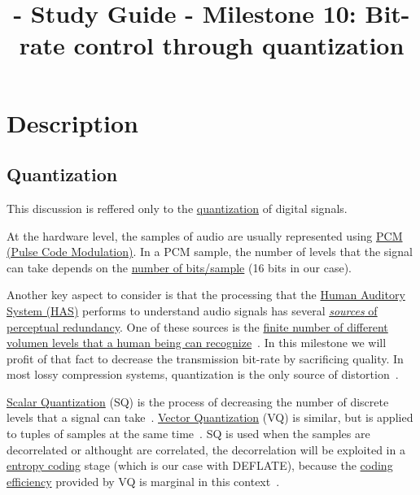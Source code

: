 
\title{\TM{} - Study Guide - Milestone 10: Bit-rate control through quantization}

\maketitle

\section{Description}

\subsection{Quantization}
This discussion is reffered only to the
\href{https://en.wikipedia.org/wiki/Quantization_(signal_processing)}{quantization}
of digital signals.

At the hardware level, the samples of audio are usually represented
using \href{https://en.wikipedia.org/wiki/Pulse-code_modulation}{PCM
  (Pulse Code Modulation)}. In a PCM sample, the number of levels that
the signal can take depends on the
\href{https://en.wikipedia.org/wiki/Audio_bit_depth}{number of
  bits/sample} (16 bits in our case).

Another key aspect to consider is that the processing that the
\href{https://en.wikipedia.org/wiki/Auditory_system}{Human Auditory
  System (HAS)} performs to understand audio signals has several
\href{https://en.wikipedia.org/wiki/Psychoacoustics}{\emph{sources} of
  perceptual redundancy}. One of these sources is the
\href{https://en.wikipedia.org/wiki/Equal-loudness_contour}{finite
  number of different volumen levels that a human being can
  recognize}~\cite{bosi2003intro}. In this milestone we will profit of
that fact to decrease the transmission bit-rate by sacrificing
quality.  In most lossy compression systems, quantization is the only
source of distortion~\cite{taubman2002jpeg2000}.

\href{https://en.wikipedia.org/wiki/Quantization_(signal_processing)}{Scalar
  Quantization} (SQ) is the process of decreasing the number of
discrete levels that a signal can
take~\cite{sayood2017introduction}. \href{https://en.wikipedia.org/wiki/Vector_quantization}{Vector
Quantization} (VQ) is similar, but is applied to tuples of samples at
the same time~\cite{vetterli2014foundations}. SQ is used when the
samples are decorrelated or althought are correlated, the decorrelation
will be exploited in
a \href{https://en.wikipedia.org/wiki/Entropy_encoding}{entropy
coding} stage (which is our case with DEFLATE), because the
\href{https://en.wikipedia.org/wiki/Quantization_(signal_processing)#Rate%E2%80%93distortion_optimization}{coding
  efficiency} provided by VQ is marginal in this
context~\cite{vetterli2014foundations}.

